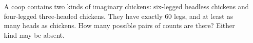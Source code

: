 A coop contains two kinds of imaginary chickens: six-legged headless chickens and four-legged three-headed chickens. They have exactly $60$ legs, and at least as many heads as chickens. How many possible pairs of counts are there? Either kind may be absent.
